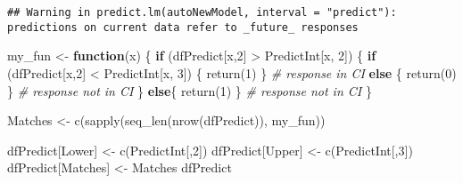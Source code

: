 \documentclass[
]{article}
\newenvironment{Shaded}{\begin{snugshade}}{\end{snugshade}}
\newcommand{\CommentTok}[1]{\textcolor[rgb]{0.56,0.35,0.01}{\textit{#1}}}
\newcommand{\ControlFlowTok}[1]{\textcolor[rgb]{0.13,0.29,0.53}{\textbf{#1}}}
\newcommand{\DecValTok}[1]{\textcolor[rgb]{0.00,0.00,0.81}{#1}}
\newcommand{\FunctionTok}[1]{\textcolor[rgb]{0.00,0.00,0.00}{#1}}
\newcommand{\NormalTok}[1]{#1}
\newcommand{\OtherTok}[1]{\textcolor[rgb]{0.56,0.35,0.01}{#1}}
\newcommand{\SpecialCharTok}[1]{\textcolor[rgb]{0.00,0.00,0.00}{#1}}
\newcommand{\StringTok}[1]{\textcolor[rgb]{0.31,0.60,0.02}{#1}}
\begin{document}
\begin{verbatim}
## Warning in predict.lm(autoNewModel, interval = "predict"): predictions on current data refer to _future_ responses
\end{verbatim}

\begin{Shaded}
\begin{Highlighting}[]
\NormalTok{my\_fun }\OtherTok{\textless{}{-}} \ControlFlowTok{function}\NormalTok{(x) \{}
  \ControlFlowTok{if}\NormalTok{ (dfPredict[x,}\DecValTok{2}\NormalTok{] }\SpecialCharTok{\textgreater{}}\NormalTok{ PredictInt[x, }\DecValTok{2}\NormalTok{]) \{}
    \ControlFlowTok{if}\NormalTok{ (dfPredict[x,}\DecValTok{2}\NormalTok{] }\SpecialCharTok{\textless{}}\NormalTok{ PredictInt[x, }\DecValTok{3}\NormalTok{]) \{}
      \FunctionTok{return}\NormalTok{(}\DecValTok{1}\NormalTok{)}
\NormalTok{    \} }\CommentTok{\# response in CI}
    \ControlFlowTok{else}\NormalTok{ \{}
      \FunctionTok{return}\NormalTok{(}\DecValTok{0}\NormalTok{)}
\NormalTok{    \} }\CommentTok{\# response not in CI}
\NormalTok{  \}}
  \ControlFlowTok{else}\NormalTok{\{}
    \FunctionTok{return}\NormalTok{(}\DecValTok{1}\NormalTok{)}
\NormalTok{  \} }\CommentTok{\# response not in CI}
\NormalTok{\}}

\NormalTok{Matches }\OtherTok{\textless{}{-}} \FunctionTok{c}\NormalTok{(}\FunctionTok{sapply}\NormalTok{(}\FunctionTok{seq\_len}\NormalTok{(}\FunctionTok{nrow}\NormalTok{(dfPredict)), my\_fun))}

\NormalTok{dfPredict[}\StringTok{\textquotesingle{}Lower\textquotesingle{}}\NormalTok{] }\OtherTok{\textless{}{-}} \FunctionTok{c}\NormalTok{(PredictInt[,}\DecValTok{2}\NormalTok{])}
\NormalTok{dfPredict[}\StringTok{\textquotesingle{}Upper\textquotesingle{}}\NormalTok{] }\OtherTok{\textless{}{-}} \FunctionTok{c}\NormalTok{(PredictInt[,}\DecValTok{3}\NormalTok{])}
\NormalTok{dfPredict[}\StringTok{\textquotesingle{}Matches\textquotesingle{}}\NormalTok{] }\OtherTok{\textless{}{-}}\NormalTok{ Matches}
\NormalTok{dfPredict}
\end{Highlighting}
\end{Shaded}
\end{document}
